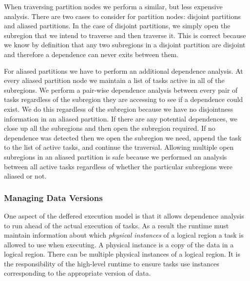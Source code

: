 When traversing partition nodes we perform a similar, but less expensive analysis.  There
are two cases to consider for partition nodes: disjoint partitions and aliased partitions.
In the case of disjoint partitions, we simply open the subregion that we intend to traverse
and then traverse it.  This is correct because we know by definition that any two 
subregions in a disjoint partition are disjoint and therefore a dependence can never exits
between them.

For aliased partitions we have to perform an additional dependence analysis.  At every
aliased partition node we maintain a list of tasks active in all of the subregions.  We
perform a pair-wise dependence analysis between every pair of tasks regardless of the subregion
they are accessing to see if a dependence could exist.  We do this regardless of the subregion
because we have no disjointness information in an aliased partition.  If there are any
potential dependences, we close up all the subregions and then open the subregion required.  If
no dependence was detected then we open the subregion we need, append the task to the list
of active tasks, and continue the traversal.  Allowing multiple open subregions in an aliased
partition is safe because we performed an analysis between all active tasks regardless of
whether the particular subregions were aliased or not.

\subsubsection{Managing Data Versions}
\label{subsec:dataflow}
One aspect of the deffered execution model is that it allows dependence analysis to run
ahead of the actual execution of tasks.  As a result the runtime must maintain information
about which {\em physical instances} of a logical region a task is allowed to use when executing.
A physical instance is a copy of the data in a logical region.  There can be multiple
physical instances of a logical region.  It is the responsibility of the high-level runtime
to ensure tasks use instances corresponding to the appropriate version of data.


